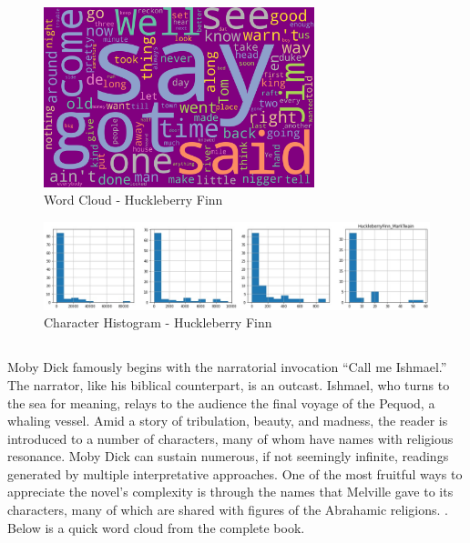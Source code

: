 \begin{figure}[H]
	\begin{center}
		\includegraphics[width = 0.7\textwidth]{Images/HuckleberryFinn_MarkTwain.jpeg} %
		\caption{Word Cloud - Huckleberry Finn}
		\label{fig:huckleberry-finn}
	\end{center}
\end{figure}

\begin{figure}[H]
	\begin{center}
		\includegraphics[width = 1.0\textwidth]{Images/char_hist_HuckleberryFinn_MarkTwain.jpeg} %
		\caption{Character Histogram - Huckleberry Finn}
		\label{fig:histogram-huckbfinn}
	\end{center}
\end{figure}

\subsection{\textcite{moby-dick}} %
\label{sec:moby-dick} %

Moby Dick famously begins with the narratorial invocation “Call me Ishmael.” The narrator, like his biblical counterpart, is an outcast. Ishmael, who turns to the sea for meaning, relays to the audience the final voyage of the Pequod, a whaling vessel. Amid a story of tribulation, beauty, and madness, the reader is introduced to a number of characters, many of whom have names with religious resonance. Moby Dick can sustain numerous, if not seemingly infinite, readings generated by multiple interpretative approaches. One of the most fruitful ways to appreciate the novel’s complexity is through the names that Melville gave to its characters, many of which are shared with figures of the Abrahamic religions. \textcite{moby-dick-summary}. Below is a quick word cloud from the complete book. 

